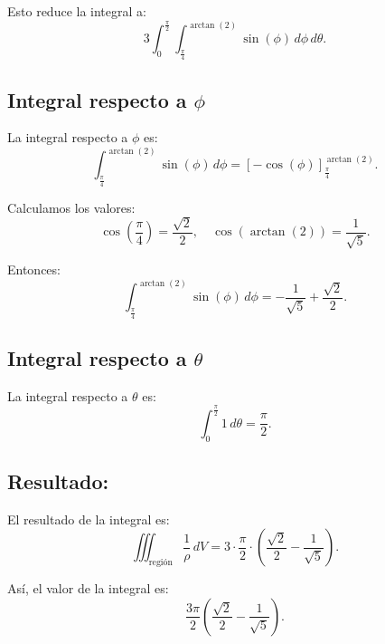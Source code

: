 	Esto reduce la integral a:
	\[
	3 \int_{0}^{\frac{\pi}{2}} \int_{\frac{\pi}{4}}^{\arctan(2)} \sin(\phi) \, d\phi \, d\theta.
	\]
	
	\subsection*{Integral respecto a \( \phi \)}
	La integral respecto a \( \phi \) es:
	\[
	\int_{\frac{\pi}{4}}^{\arctan(2)} \sin(\phi) \, d\phi = \left[-\cos(\phi)\right]_{\frac{\pi}{4}}^{\arctan(2)}.
	\]
	
	Calculamos los valores:
	\[
	\cos\left(\frac{\pi}{4}\right) = \frac{\sqrt{2}}{2}, \quad \cos(\arctan(2)) = \frac{1}{\sqrt{5}}.
	\]
	
	Entonces:
	\[
	\int_{\frac{\pi}{4}}^{\arctan(2)} \sin(\phi) \, d\phi = -\frac{1}{\sqrt{5}} + \frac{\sqrt{2}}{2}.
	\]
	
	\subsection*{Integral respecto a \( \theta \)}
	La integral respecto a \( \theta \) es:
	\[
	\int_{0}^{\frac{\pi}{2}} 1 \, d\theta = \frac{\pi}{2}.
	\]
	
	\subsection*{Resultado:}
	El resultado de la integral es:
	\[
	\iiint_{\text{región}} \frac{1}{\rho} \, dV = 3 \cdot \frac{\pi}{2} \cdot \left(\frac{\sqrt{2}}{2} - \frac{1}{\sqrt{5}}\right).
	\]
	
	Así, el valor de la integral es:
	\[
	\boxed{\frac{3\pi}{2} \left(\frac{\sqrt{2}}{2} - \frac{1}{\sqrt{5}}\right)}.
	\]
	

